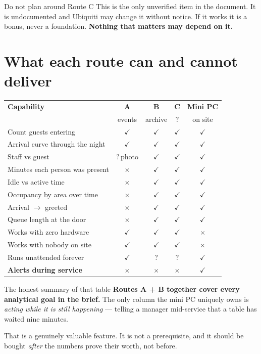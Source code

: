 \documentclass[11pt,a4paper]{article}
\newcommand{\tick}{\textcolor{ok}{$\checkmark$}}
\newcommand{\cross}{\textcolor{bad}{$\times$}}
\newcommand{\qmark}{\textcolor{warn}{?}}
\begin{document}
\begin{alert}{Do not plan around Route C}
This is the only unverified item in the document. It is undocumented and
Ubiquiti may change it without notice. If it works it is a bonus, never a
foundation. \textbf{Nothing that matters may depend on it.}
\end{alert}

\section{What each route can and cannot deliver}

\begin{center}
\begin{tabular}{@{}p{5.6cm}cccc@{}}
\toprule
\textbf{Capability} & \textbf{A} & \textbf{B} & \textbf{C} & \textbf{Mini PC} \\
                    & \small events & \small archive & \small \qmark & \small on site \\
\midrule
Count guests entering            & \tick & \tick & \tick & \tick \\
Arrival curve through the night  & \tick & \tick & \tick & \tick \\
Staff vs guest                   & \qmark\small\,photo & \tick & \tick & \tick \\
Minutes each person was present  & \cross & \tick & \tick & \tick \\
Idle vs active time              & \cross & \tick & \tick & \tick \\
Occupancy by area over time      & \cross & \tick & \tick & \tick \\
Arrival $\rightarrow$ greeted    & \cross & \tick & \tick & \tick \\
Queue length at the door         & \cross & \tick & \tick & \tick \\
\midrule
Works with zero hardware         & \tick & \tick & \tick & \cross \\
Works with nobody on site        & \tick & \tick & \tick & \cross \\
Runs unattended forever          & \tick & \qmark & \qmark & \tick \\
\textbf{Alerts during service}   & \cross & \cross & \cross & \tick \\
\bottomrule
\end{tabular}
\end{center}

\begin{note}{The honest summary of that table}
\textbf{Routes A + B together cover every analytical goal in the brief.}
The only column the mini PC uniquely owns is \emph{acting while it is still
happening} --- telling a manager mid-service that a table has waited nine
minutes.

\vspace{4pt}
That is a genuinely valuable feature. It is not a prerequisite, and it
should be bought \emph{after} the numbers prove their worth, not before.
\end{note}
\end{document}
